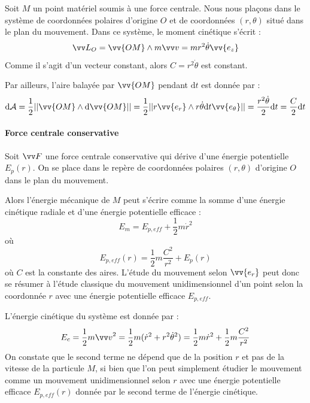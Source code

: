 \documentclass[11pt,fleqn]{book} %
\newcommand{\dd}{\mathrm{d}}
\begin{document}
\begin{demonstration}
    Soit $M$ un point matériel soumis à une force centrale. Nous nous plaçons dans le système de coordonnées polaires d'origine $O$ et de coordonnées $(r,\theta)$ situé dans le plan du mouvement. Dans ce système, le moment cinétique s'écrit :
    \begin{equation}
        \vv L_O = \vv{OM} \wedge m \vv v = m r^2 \dot \theta \vv{e_z}
    \end{equation}
    Comme il s'agit d'un vecteur constant, alors $C = r^2 \dot \theta$ est constant.

    Par ailleurs, l'aire balayée par $\vv{OM}$ pendant $\dd t$ est donnée par :
    \begin{equation}
        \dd \mathcal{A} = \frac{1}{2} || \vv{OM} \wedge \dd \vv{OM} || = \frac{1}{2} || r \vv{e_r} \wedge r \dot \theta \dd t \vv{e_\theta} || = \frac{r^2 \dot \theta}{2} \dd t = \frac{C}{2} \dd t 
    \end{equation}
\end{demonstration}

\paragraph{Force centrale conservative}

\begin{proposition}
    Soit $\vv F$ une force centrale conservative qui dérive d'une énergie potentielle $E_p(r)$. On se place dans le repère de coordonnées polaires $(r,\theta)$ d'origine $O$ dans le plan du mouvement.

    Alors l'énergie mécanique de $M$ peut s'écrire comme la somme d'une énergie cinétique radiale et d'une énergie potentielle efficace :
    \begin{equation}
        E_m = E_{p,eff} + \frac{1}{2} m {\dot r}^2
    \end{equation}
    où
    \begin{equation}
        E_{p,eff}(r) = \frac{1}{2} m \frac{C^2}{r^2} + E_p(r)
    \end{equation}
    où $C$ est la constante des aires. L'étude du mouvement selon $\vv{e_r}$ peut donc se résumer à l'étude classique du mouvement unidimensionnel d'un point selon la coordonnée $r$ avec une énergie potentielle efficace $E_{p,eff}$.
\end{proposition}

\begin{demonstration}
    L'énergie cinétique du système est donnée par :
    \begin{equation}
        E_c = \frac{1}{2} m {\vv v}^2 = \frac{1}{2} m (\dot r^2 + r^2 \dot \theta^2) = \frac{1}{2} m \dot r^2 + \frac{1}{2} m \frac{C^2}{r^2}
    \end{equation}
    On constate que le second terme ne dépend que de la position $r$ et pas de la vitesse de la particule $M$, si bien que l'on peut simplement étudier le mouvement comme un mouvement unidimensionnel selon $r$ avec une énergie potentielle efficace $E_{p,eff}(r)$ donnée par le second terme de l'énergie cinétique.
\end{demonstration}
\end{document}
